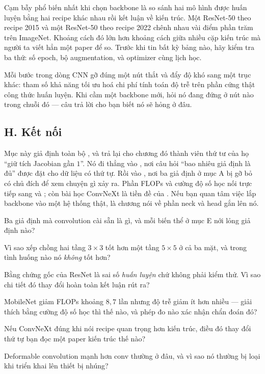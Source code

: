 \documentclass[../../../deep_learning.tex]{subfiles}
\begin{document}
\begin{cambay}
Cạm bẫy phổ biến nhất khi chọn backbone là so sánh hai mô hình được huấn luyện bằng hai recipe khác nhau rồi kết luận về kiến trúc. Một ResNet-50 theo recipe 2015 và một ResNet-50 theo recipe 2022 chênh nhau vài điểm phần trăm trên ImageNet. Khoảng cách đó lớn hơn khoảng cách giữa nhiều cặp kiến trúc mà người ta viết hẳn một paper để so. Trước khi tin bất kỳ bảng nào, hãy kiểm tra ba thứ: số epoch, bộ augmentation, và optimizer cùng lịch học.
\end{cambay}

\begin{cannho}
Mỗi bước trong dòng CNN gỡ đúng một nút thắt và đẩy độ khó sang một trục khác: tham số \ra khả năng tối ưu hoá \ra chi phí tính toán \ra độ trễ trên phần cứng thật \ra công thức huấn luyện. Khi cầm một backbone mới, hỏi nó đang đứng ở nút nào trong chuỗi đó --- câu trả lời cho bạn biết nó sẽ hỏng ở đâu. 
\end{cannho}

\subsection{H. Kết nối}
Mục này giả định toàn bộ , và trả lại cho chương đó thành viên thứ tư của họ ``giữ tích Jacobian gần \(1\)''. Nó đi thẳng vào , nơi câu hỏi ``bao nhiêu giả định là đủ'' được đặt cho dữ liệu có thứ tự. Rồi vào , nơi ba giả định ở mục A bị gỡ bỏ có chủ đích để xem chuyện gì xảy ra. Phần FLOPs và cường độ số học nối trực tiếp sang  và ; còn bài học ConvNeXt là tiền đề của . Nếu bạn quan tâm việc lắp backbone vào một hệ thống thật,  là chương nói về phần neck và head gắn lên nó.

\begin{tukiem}
\item Ba giả định mà convolution cài sẵn là gì, và mỗi biến thể ở mục E nới lỏng giả định nào?
\item Vì sao xếp chồng hai tầng \(3\times3\) tốt hơn một tầng \(5\times5\) ở cả ba mặt, và trong tình huống nào nó \emph{không} tốt hơn?
\item Bằng chứng gốc của ResNet là sai số \emph{huấn luyện} chứ không phải kiểm thử. Vì sao chi tiết đó thay đổi hoàn toàn kết luận rút ra?
\item MobileNet giảm FLOPs khoảng \(8{,}7\) lần nhưng độ trễ giảm ít hơn nhiều --- giải thích bằng cường độ số học thì thế nào, và phép đo nào xác nhận chẩn đoán đó?
\item Nếu ConvNeXt đúng khi nói recipe quan trọng hơn kiến trúc, điều đó thay đổi thứ tự bạn đọc một paper kiến trúc thế nào?
\item Deformable convolution mạnh hơn conv thường ở đâu, và vì sao nó thường bị loại khi triển khai lên thiết bị nhúng?
\end{tukiem}
\ifSubfilesClassLoaded{\printbibliography[title={Nguồn}]}{}
\end{document}
